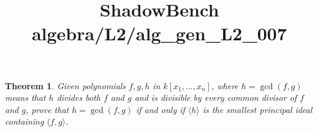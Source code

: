 \documentclass{article}
\title{ShadowBench algebra/L2/alg\_gen\_L2\_007}
\newtheorem{theorem}{Theorem}
\begin{document}
\maketitle

\begin{theorem}
Given polynomials $f,g,h$ in $k[x_1,\dots,x_n]$, where
$h=\gcd(f,g)$ means that $h$ divides both $f$ and $g$ and is divisible by every common divisor of
$f$ and $g$, prove that $h=\gcd(f,g)$ if and only if $\langle h\rangle$ is the smallest
principal ideal containing $\langle f,g\rangle$.
\end{theorem}
\end{document}

